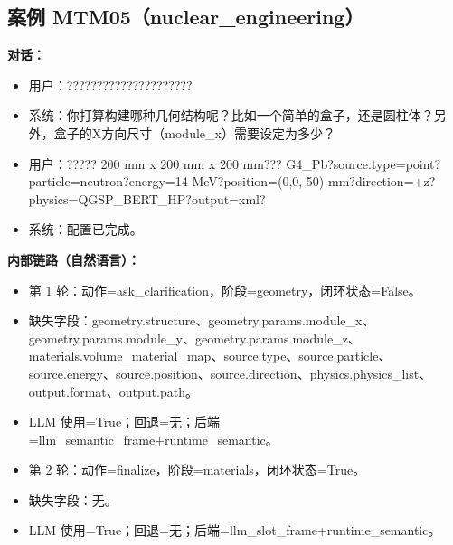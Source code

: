 \documentclass[11pt]{ctexart}
\begin{document}
\subsection{案例 MTM05（nuclear\_engineering）}
\textbf{对话：}
\begin{itemize}
\item 用户：?????????????????????
\item 系统：你打算构建哪种几何结构呢？比如一个简单的盒子，还是圆柱体？另外，盒子的X方向尺寸（module\_x）需要设定为多少？
\item 用户：????? 200 mm x 200 mm x 200 mm??? G4\_Pb?source.type=point?particle=neutron?energy=14 MeV?position=(0,0,-50) mm?direction=+z?physics=QGSP\_BERT\_HP?output=xml?
\item 系统：配置已完成。
\end{itemize}
\textbf{内部链路（自然语言）：}
\begin{itemize}
\item 第 1 轮：动作=ask\_clarification，阶段=geometry，闭环状态=False。
\item 缺失字段：geometry.structure、geometry.params.module\_x、geometry.params.module\_y、geometry.params.module\_z、materials.volume\_material\_map、source.type、source.particle、source.energy、source.position、source.direction、physics.physics\_list、output.format、output.path。
\item LLM 使用=True；回退=无；后端=llm\_semantic\_frame+runtime\_semantic。
\item 第 2 轮：动作=finalize，阶段=materials，闭环状态=True。
\item 缺失字段：无。
\item LLM 使用=True；回退=无；后端=llm\_slot\_frame+runtime\_semantic。
\end{itemize}
\end{document}
